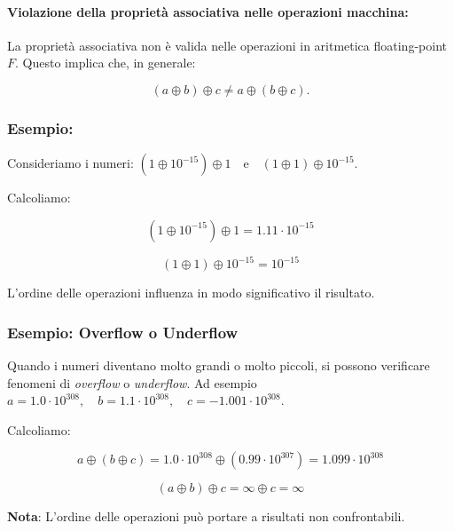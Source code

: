 \documentclass[a4paper, 11pt]{article}
\begin{document}
        \paragraph{Violazione della proprietà associativa nelle operazioni macchina: }

        La proprietà associativa non è valida nelle operazioni in aritmetica floating-point \( F \). Questo implica che, in generale:


        \[
        (a \oplus b) \oplus c \neq a \oplus (b \oplus c).
        \]



        \subsubsection*{Esempio: }
        Consideriamo i numeri: $ (1 \oplus 10^{-15}) \oplus 1 \quad \text{e} \quad (1 \oplus 1) \oplus 10^{-15}. $



        Calcoliamo:


        \[
        (1 \oplus 10^{-15}) \oplus 1 = 1.11 \cdot 10^{-15}
        \]




        \[
        (1 \oplus 1) \oplus 10^{-15} = 10^{-15}
        \]



        L'ordine delle operazioni influenza in modo significativo il risultato.

        \subsubsection*{Esempio: Overflow o Underflow}
        Quando i numeri diventano molto grandi o molto piccoli, si possono verificare fenomeni di \textit{overflow} o \textit{underflow}. Ad esempio $a = 1.0 \cdot 10^{308}, \quad b = 1.1 \cdot 10^{308}, \quad c = -1.001 \cdot 10^{308}. $


        Calcoliamo:


        \[
        a \oplus (b \oplus c) = 1.0 \cdot 10^{308} \oplus (0.99 \cdot 10^{307}) = 1.099 \cdot 10^{308}
        \]




        \[
        (a \oplus b) \oplus c = \infty \oplus c = \infty
        \]



        \textbf{Nota}: L'ordine delle operazioni può portare a risultati non confrontabili.
                
\end{document}
